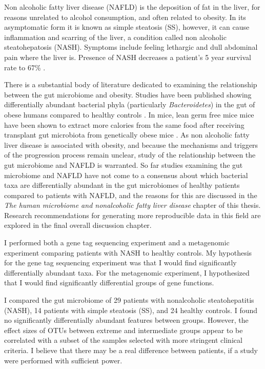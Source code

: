 Non alcoholic fatty liver disease (NAFLD) is the deposition of fat in the liver, for reasons unrelated to alcohol consumption, and often related to obesity. In its asymptomatic form it is known as simple steatosis (SS), however, it can cause inflammation and scarring of the liver, a condition called non alcoholic steatohepatosis (NASH). Symptoms include feeling lethargic and dull abdominal pain where the liver is. Presence of NASH decreases a patient's 5 year survival rate to 67\% \cite{propst1995prognosis}.

There is a substantial body of literature dedicated to examining the relationship between the gut microbiome and obesity. Studies have been published showing differentially abundant bacterial phyla (particularly \textit{Bacteroidetes}) in the gut of obese humans compared to healthy controls \cite{turnbaugh2009core} \cite{ley2006microbial}. In mice, lean germ free mice mice have been shown to extract more calories from the same food after receiving transplant gut microbiota from genetically obese mice \cite{turnbaugh2006obesity}. As non alcoholic fatty liver disease is associated with obesity, and because the mechanisms and triggers of the progression process remain unclear, study of the relationship between the gut microbiome and NAFLD is warranted. So far studies examining the gut microbiome and NAFLD \cite{wong2013molecular} \cite{zhu2013characterization} \cite{jiang2015dysbiosis} \cite{raman2013fecal} \cite{boursier2016severity} have not come to a consensus about which bacterial taxa are differentially abundant in the gut microbiomes of healthy patients compared to patients with NAFLD, and the reasons for this are discussed in the \textit{The human microbiome and nonalcoholic fatty liver disease} chapter of this thesis. Research recommendations for generating more reproducible data in this field are explored in the final overall discussion chapter.

I performed both a gene tag sequencing experiment and a metagenomic experiment comparing patients with NASH to healthy controls. My hypothesis for the gene tag sequencing experiment was that I would find significantly differentially abundant taxa. For the metagenomic experiment, I hypothesized that I would find significantly differential groups of gene functions.

I compared the gut microbiome of 29 patients with nonalcoholic steatohepatitis (NASH), 14 patients with simple steatosis (SS), and 24 healthy controls. I found no significantly differentially abundant features between groups. However, the effect sizes of OTUs between extreme and intermediate groups appear to be correlated with a subset of the samples selected with more stringent clinical criteria. I believe that there may be a real difference between patients, if a study were performed with sufficient power.
